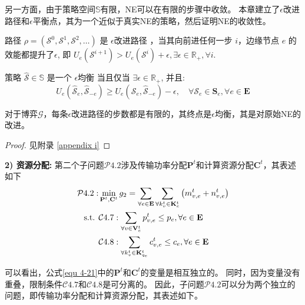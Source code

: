 \noindent 另一方面，由于策略空间$\mathbb{S}$有限，NE可以在有限的步骤中收敛。
本章建立了$\epsilon$改进路径和$\epsilon$平衡点\cite{chew2016potential}，其为一个近似于真实NE的策略，然后证明NE的收敛性。
\begin{definition} 
	路径 $\rho=\left(\mathcal{S}^{0}, \mathcal{S}^{1}, \mathcal{S}^{2}, \ldots\right)$ 是 $\epsilon$改进路径 \cite{chew2016potential}，当其向前进任何一步 $i$，边缘节点 $e$ 的效能都提升了$\epsilon$, 即 $U_{e}\left(\mathcal{S}^{i+1}\right) > U_{e}\left(\mathcal{S}^{i}\right) + \epsilon, \exists \epsilon \in \mathbb{R}_{+}, \forall i$.
\end{definition}
\begin{definition}
	策略 $\mathcal{\hat{S}} \in \mathbb{S}$ 是一个 $\epsilon$均衡 \cite{chew2016potential} 当且仅当 $\exists \epsilon \in \mathbb{R}_{+}$, 并且:
	\begin{equation}
		U_{e}\left(\mathcal{\hat{S}}_{e}, \mathcal{\hat{S}}_{-e}\right) \geq U_{e}\left(\mathcal{S}_{e}, \mathcal{\hat{S}}_{-e}\right) - \epsilon, \quad \forall \mathcal{S}_{e} \in \mathbf{S}_{e}, \forall e \in \mathbf{E}
	\end{equation}
\end{definition}
\begin{theorem}
对于博弈$\mathcal{G}$，每条$\epsilon$改进路径的步数都是有限的，其终点是$\epsilon$均衡，其是对原始NE的改进。
\label{theorem 4-3}
\end{theorem}
\begin{proof} 见附录 \ref{appendix i}
\end{proof}

\textbf{2) 资源分配:} 第二个子问题$\mathcal{P}4.2$涉及传输功率分配$\mathbf{P}^{t}$和计算资源分配$\mathbf{C}^{t}$，其表述如下
\begin{align}
	\mathcal{P}4.2: &\min_{\mathbf{P}^{t}, \mathbf{C}^{t}} g_2= \sum_{ \forall e \in \mathbf{E}} \sum_{\forall k_{v}^{t} \in \mathbf{K}_{e}^{t}} \left( m_{v, e}^{t} +  n_{v, e}^{t} \right) \notag \\
	\text { s.t. }
    &\mathcal{C}4.7: \sum_{\forall v \in \mathbf{V}_{e}^{t}} p_{v, e}^{t} \leq p_{e}, \forall e \in \mathbf{E} \notag \\
    &\mathcal{C}4.8: \sum_{\forall k_{v}^{t} \in {\mathbf{K}_{q_e}^{t} }} c_{v, e}^t \leq c_{e}, \forall e \in \mathbf{E}
\label{equ 4-21}
\end{align}

\noindent 可以看出，公式\ref{equ 4-21}中的$\mathbf{P}^{t}$和$\mathbf{C}^{t}$的变量是相互独立的。
同时，因为变量没有重叠，限制条件$\mathcal{C}4.7$和$\mathcal{C}4.8$是可分离的。
因此，子问题$\mathcal{P}4.2$可以分为两个独立的问题，即传输功率分配和计算资源分配，其表述如下。


